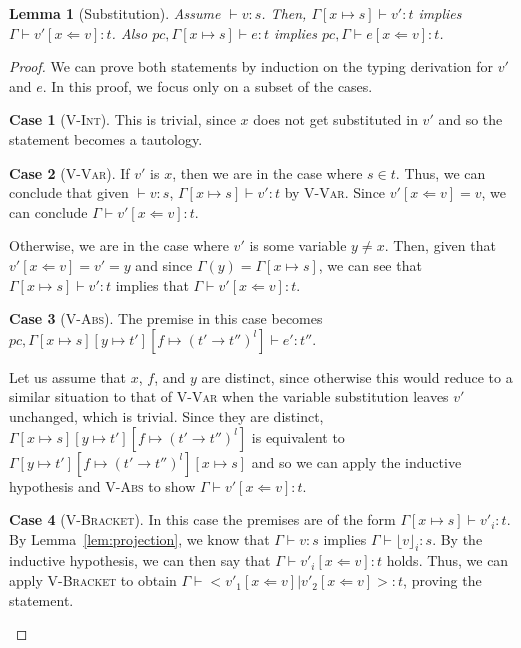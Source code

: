 \documentclass[a4paper,twocolumn]{article}
\newcommand{\typeRule}[3]{#1 \vdash #2 \colon #3}
\newcommand{\lift}[1]{\lfloor #1 \rfloor}
\theoremstyle{plain}
\newtheorem{lemma}{Lemma}
\theoremstyle{definition}
\newtheorem*{case}{Case}
\begin{document}
\begin{lemma}[Substitution]
  \label{lem:substitution}
  Assume $\typeRule{ }{v}{s}$.  Then, $\typeRule{\Gamma[x \mapsto s]}{v'}{t}$
  implies $\typeRule{\Gamma}{v'[x \Leftarrow v]}{t}$.  Also $\typeRule{pc,
  \Gamma[x \mapsto s]}{e}{t}$ implies $\typeRule{pc, \Gamma}{e[x \Leftarrow
  v]}{t}$.
\end{lemma}
\begin{proof}
  We can prove both statements by induction on the typing derivation for $v'$
  and $e$.  In this proof, we focus only on a subset of the cases.

  \begin{case}[\textsc{V-Int}]
    This is trivial, since $x$ does not get substituted in $v'$ and so the
    statement becomes a tautology.
  \end{case}

  \begin{case}[\textsc{V-Var}]
    If $v'$ is $x$, then we are in the case where $s \in t$.  Thus, we can
    conclude that given $\typeRule{ }{v}{s}$, $\typeRule{\Gamma[x \mapsto
    s]}{v'}{t}$ by \textsc{V-Var}.  Since $v'[x \Leftarrow v] = v$, we can
    conclude $\typeRule{\Gamma}{v'[x \Leftarrow v]}{t}$.

    Otherwise, we are in the case where $v'$ is some variable $y \neq x$.
    Then, given that $v'[x \Leftarrow v] = v' = y$ and since $\Gamma(y) =
    \Gamma[x \mapsto s]$, we can see that $\typeRule{\Gamma[x \mapsto
    s]}{v'}{t}$ implies that $\typeRule{\Gamma}{v'[x \Leftarrow v]}{t}$.
  \end{case}

  \begin{case}[\textsc{V-Abs}]
    The premise in this case becomes $\typeRule{pc, \Gamma[x \mapsto s][y
    \mapsto t'][f \mapsto (t' \to t'')^l]}{e'}{t''}$.

    Let us assume that $x$, $f$, and $y$ are distinct, since otherwise this
    would reduce to a similar situation to that of \textsc{V-Var} when the
    variable substitution leaves $v'$ unchanged, which is trivial.  Since they
    are distinct, $\Gamma[x \mapsto s][y \mapsto t'][f \mapsto (t' \to t'')^l]$
    is equivalent to $\Gamma[y \mapsto t'][f \mapsto (t' \to t'')^l][x \mapsto
    s]$ and so we can apply the inductive hypothesis and \textsc{V-Abs} to show
    $\typeRule{\Gamma}{v'[x \Leftarrow v]}{t}$.
  \end{case}

  \begin{case}[\textsc{V-Bracket}]
    In this case the premises are of the form $\typeRule{\Gamma[x \mapsto
    s]}{v'_i}{t}$.  By Lemma~\ref{lem:projection}, we know that
    $\typeRule{\Gamma}{v}{s}$ implies $\typeRule{\Gamma}{\lift{v}_i}{s}$.  By
    the inductive hypothesis, we can then say that $\typeRule{\Gamma}{v'_i[x
    \Leftarrow v]}{t}$ holds.  Thus, we can apply \textsc{V-Bracket} to obtain
    $\typeRule{\Gamma}{<v'_1[x \Leftarrow v] | v'_2[x \Leftarrow v]>}{t}$,
    proving the statement.
  \end{case}


\end{proof}
\end{document}
